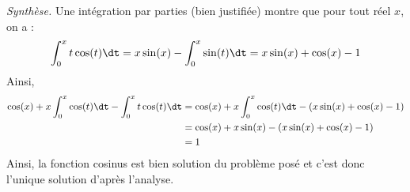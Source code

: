 \documentclass[a4paper,10pt]{report}
\begin{document}
\noindent \textit{Synthèse.} Une intégration par parties (bien justifiée) montre que pour tout réel $x$, on a :
$$ \int_0^x t \cos(t) \dt = x \sin(x) - \int_0^x \sin(t) \dt = x \sin(x) + \cos(x) - 1 $$
Ainsi,
\begin{align*}
\cos(x) + x \int_0^x \cos(t) \dt - \int_0^x t \cos(t) \dt & =  \cos(x) + x \int_0^x \cos(t) \dt  - (x \sin(x) + \cos(x) - 1) \\
& = \cos(x) + x \sin(x)  - (x \sin(x) + \cos(x) - 1) \\
& = 1 
\end{align*}
Ainsi, la fonction cosinus est bien solution du problème posé et c'est donc l'unique solution d'après l'analyse.
%
%
%
\end{document}
